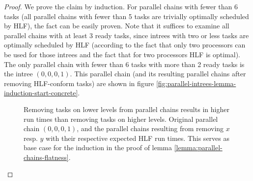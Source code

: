 \begin{proof}
  \newcommand{\iminus}[1]{I\setminus\{#1\}}

  We prove the claim by induction. For parallel chains with fewer than 6 tasks (all parallel chains with fewer than 5 tasks are trivially optimally scheduled by HLF), the fact can be easily proven. Note that it suffices to examine all parallel chains with at least 3 ready tasks, since intrees with two or less tasks are optimally scheduled by HLF (according to the fact that only two processors can be used for those intrees and the fact that for two processors HLF is optimal). The only parallel chain with fewer than 6 tasks with more than 2 ready tasks is the intree $(0,0,0,1)$. This parallel chain (and its resulting parallel chains after removing HLF-conform tasks) are shown in figure       \ref{fig:parallel-intrees-lemma-induction-start-concrete}.

  \begin{figure}[th]
    \centering
    \caption{Removing tasks on lower levels from parallel chains results in higher run times than removing tasks on higher levels. Original parallel chain $(0,0,0,1)$, and the parallel chains resulting from removing $x$ resp. $y$ with their respective expected HLF run times. This serves as base case for the induction in the proof of lemma \ref{lemma:parallel-chains-flatness}.}
    \label{fig:parallel-intrees-lemma-induction-start-concrete}
    \label{fig:parallel-intrees-lemma-induction-start}
  \end{figure}


\end{proof}
